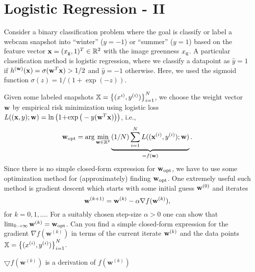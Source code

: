 \documentclass[article,11pt]{article}
\begin{document}
 

\newpage

\section{Logistic Regression - II}
Consider a binary classification problem where the goal is classify or label a webcam snapshot into ``winter'' ($y=-1$) or ``summer'' ($y=1$) based on the feature vector 
${\bf x}=(x_{\rm g},1)^{T} \in \mathbb{R}^{2}$ with the image greenness $x_{\rm g}$. A particular classification 
method is logistic regression, where we classify a datapoint as $\hat{y}=1$ if $h^{({\bf w})}({\bf x})=\sigma({\bf w}^T{\bf x}) > 1/2$ and $\hat{y}=-1$ otherwise. Here, we used the sigmoid function 
$\sigma(z) = 1/(1+\exp(-z))$. 

Given some labeled snapshots $\mathbb{X} = \left\lbrace (x^{i)}, y^{(i)}) \right\rbrace_{i=1}^{N}$, we choose the weight vector ${\bf w}$ 
by empirical risk minimization using logistic loss $L(({\bf x},y); {\bf w}) = \ln\big(1\!+\!\exp\big(- y ({\bf w}^{T} {\bf x})\big)\big)$, i.e., 
\begin{equation}
{\bf w}_{\rm opt} = \arg \min\limits_{{\bf w} \in \mathbb{R}^{2}} \underbrace{(1/N) \sum_{i=1}^{N} L(({\bf x}^{(i)},y^{(i)}); {\bf w})}_{=f(\mathbf{w})}.
\end{equation} 
Since there is no simple closed-form expression for ${\bf w}_{\rm opt}$, we have to use some optimization method for (approximately) finding ${\bf w}_{\rm opt}$. One extremely useful such 
method is gradient descent which starts with some initial guess ${\bf w}^{(0)}$ and iterates 
\begin{equation}
{\bf w}^{(k+1)} = {\bf w}^{(k)} - \alpha \nabla f(\mathbf{w}^{(k)}), 
\end{equation}
for $k=0,1,\ldots$. For a suitably chosen step-size $\alpha >0$ one can show that $\lim_{k \rightarrow \infty} {\bf w}^{(k)} = {\bf w}_{\rm opt}$. Can you find a simple closed-form expression 
for the gradient $\nabla f(\mathbf{w}^{(k)})$ in terms of the current iterate ${\bf w}^{(k)}$ and the data points $\mathbb{X} = \left\lbrace (x^{(i)}, y^{(i)}) \right\rbrace_{i=1}^{N}$.  

 

\centering
$\bigtriangledown f(\textbf{w}^{(k)})$ is a derivation of $f(\textbf{w}^{(k)})$\vspace{5mm}
\end{document}
